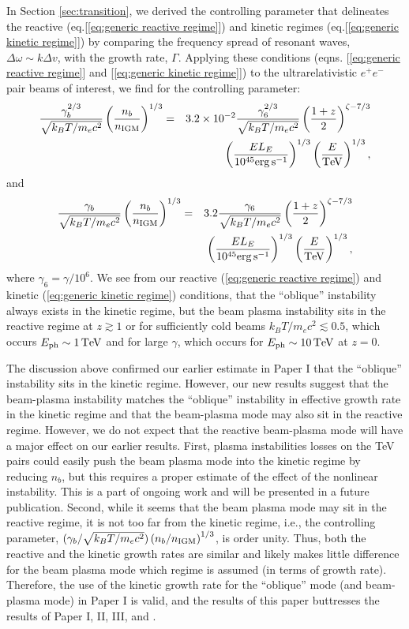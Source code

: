 \documentclass[usenatbib,iop,apj]{emulateapj}
\def\eV{{\rm eV}} %
\def\TeV{{\rm T}\eV} %
\def\erg{{\rm erg}} %
\def\s{{\rm s}}
\def\nIGM{n_{\rm IGM}}
\begin{document}
In Section \ref{sec:transition}, we derived the controlling parameter that delineates the reactive (eq.[\ref{eq:generic reactive regime}]) and kinetic regimes (eq.[\ref{eq:generic kinetic regime}]) by comparing the frequency spread of resonant waves, $\Delta\omega\sim k\Delta v$, with the growth rate, $\Gamma$.  Applying these conditions (eqns. [\ref{eq:generic reactive regime}] and [\ref{eq:generic kinetic regime}]) to the ultrarelativistic $e^+e^-$ pair beams of interest, we find for the controlling parameter: 
\begin{eqnarray}
\frac{\gamma_b^{2/3}}{\sqrt{k_BT/m_e c^2}}\left(\frac{n_b}{\nIGM}\right)^{1/3} &=& 3.2\times 10^{-2} \frac{\gamma_6^{2/3}}{\sqrt{k_BT/m_e c^2}}\left(\frac{1+z}{2}\right)^{\zeta-7/3}\nonumber\\
&&\left(\frac{E L_E}{10^{45}\erg\,\s^{-1}}\right)^{1/3}
\left(\frac{E}{\TeV}\right)^{1/3},\label{eq:beam oblique condition}
\end{eqnarray}
and
\begin{eqnarray}
\frac{\gamma_b}{\sqrt{k_BT/m_e c^2}}\left(\frac{n_b}{\nIGM}\right)^{1/3} &=& 3.2 \frac{\gamma_6}{\sqrt{k_BT/m_e c^2}}\left(\frac{1+z}{2}\right)^{\zeta-7/3}\nonumber\\
&&\left(\frac{E L_E}{10^{45}\erg\,\s^{-1}}\right)^{1/3}
\left(\frac{E}{\TeV}\right)^{1/3},\label{eq:beam bp condition}
\end{eqnarray}
where $\gamma_6 = \gamma/10^6$. 
We see from our reactive (\ref{eq:generic reactive regime}) and kinetic (\ref{eq:generic kinetic regime}) conditions, that the ``oblique'' instability always exists in the kinetic regime, but the beam plasma instability sits in the reactive regime at $z\gtrsim 1$ or for sufficiently cold beams $k_BT/m_e c^2 \lesssim 0.5$, which occurs $E_{\rm ph} \sim 1\,\TeV$ and for large $\gamma$, which occurs for $E_{\rm ph} \sim 10\,\TeV$ at $z=0$.  

The discussion above confirmed our earlier estimate in Paper I that the ``oblique'' instability sits in the kinetic regime.  However, our new results suggest that the beam-plasma instability matches the ``oblique'' instability in effective growth rate in the kinetic regime and that the beam-plasma mode may also sit in the reactive regime.  However, we do not expect that the reactive beam-plasma mode will have a major effect on our earlier results.  First, plasma instabilities losses on the TeV pairs could easily push the beam plasma mode into the kinetic regime by reducing $n_b$, but this requires a proper estimate of the effect of the nonlinear instability.  This is a part of ongoing work and will be presented in a future publication. Second, while it seems that the beam plasma mode may sit in the reactive regime, it is not too far from the kinetic regime, i.e., the controlling parameter, $({\gamma_b}/{\sqrt{k_BT/m_e c^2}})\left({n_b}/{\nIGM}\right)^{1/3}$, is order unity.  Thus, both the reactive and the kinetic growth rates are similar and likely makes little difference for the beam plasma mode which regime is assumed (in terms of growth rate).  Therefore, the use of the kinetic growth rate for the ``oblique'' mode (and beam-plasma mode)  in Paper I is valid, and the results of this paper buttresses the results of Paper I, II, III, and \citet{Puchwein+2011}.
\end{document}
